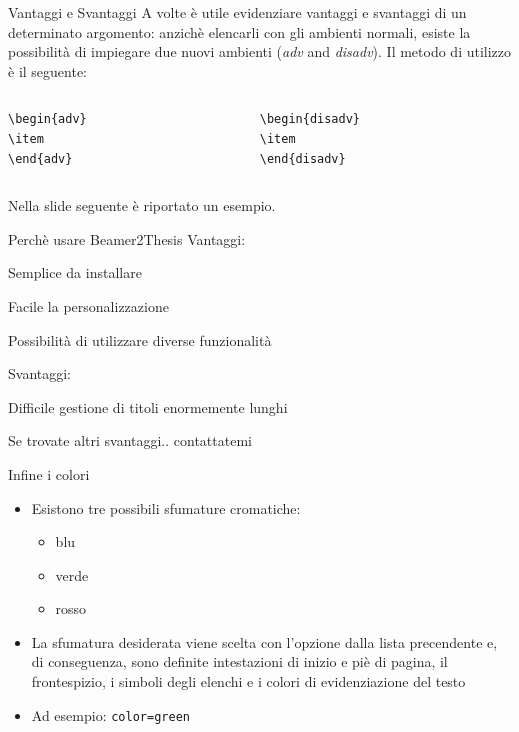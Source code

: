 \begin{frame}[t,fragile]{Vantaggi e Svantaggi}
A volte è utile evidenziare vantaggi e svantaggi di un determinato argomento: anzichè elencarli con gli ambienti normali, esiste la possibilità di impiegare due nuovi ambienti (\emph{adv} and \emph{disadv}). Il metodo di utilizzo è il seguente:
\begin{columns}
\begin{column}{0.3\paperwidth}
\begin{verbatim}
\begin{adv}
\item 
\end{adv}
\end{verbatim}
\end{column}
\begin{column}{0.3\paperwidth}
\begin{verbatim}
\begin{disadv}
\item 
\end{disadv}
\end{verbatim}
\end{column}
\end{columns}
\bigskip
Nella slide seguente è riportato un esempio.
\end{frame}

\begin{tframe}{Perchè usare Beamer2Thesis}
Vantaggi:
\begin{adv}
\item Semplice da installare
\item Facile la personalizzazione
\item Possibilità di utilizzare diverse funzionalità
\end{adv}
Svantaggi:
\begin{disadv}
\item Difficile gestione di titoli enormemente lunghi
\item Se trovate altri svantaggi.. contattatemi
\end{disadv}
\end{tframe}

\begin{frame}[t,fragile]{Infine i colori}
\begin{itemize}
\item Esistono tre possibili sfumature cromatiche:
\begin{itemize}
\item blu
\item verde
\item rosso
\end{itemize}
\item La sfumatura desiderata viene scelta con l'opzione  dalla lista precendente e, di conseguenza, sono definite intestazioni di inizio e piè di pagina, il frontespizio, i simboli degli elenchi e i colori di evidenziazione del testo
\item Ad esempio: \verb!color=green!
\end{itemize}
\end{frame}


